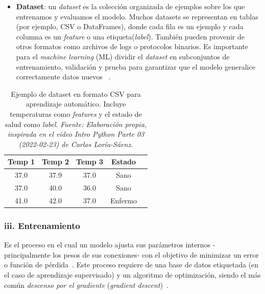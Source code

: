 \documentclass[11pt]{article} %
\begin{document}
\begin{itemize}
    \item \textbf{Dataset}: un \textit{dataset} es la colección organizada de ejemplos sobre los que entrenamos y evaluamos el modelo. Muchos datasets se representan en tablas (por ejemplo, CSV o DataFrames), donde cada fila es un ejemplo y cada columna es un \textit{feature} o una etiqueta(\textit{label}). También pueden provenir de otros formatos como archivos de logs o protocolos binarios. Es importante para el \textit{machine learning} (ML) dividir el \textit{dataset} en subconjuntos de entrenamiento, validación y prueba para garantizar que el modelo generalice correctamente datos nuevos ~\cite{googleML2025}.
\end{itemize}

\begin{table}[h]
\centering
\caption{Ejemplo de dataset en formato CSV para aprendizaje automático. Incluye temperaturas como \textit{features} y el estado de salud como \textit{label}. \textit{Fuente: Elaboración propia, inspirada en el video \textit{Intro Python Parte 03 (2022-02-23)} de Carlos Loría-Sáenz.}}

\label{tab:ml_dataset_example}
\begin{tabular}{|c|c|c|c|c|}
\hline
\textbf{Temp 1} & \textbf{Temp 2} & \textbf{Temp 3} & \textbf{Estado} \\
\hline
37.0 & 37.9 & 37.0 & Sano \\
37.0 & 40.0 & 36.0 & Sano \\
41.0 & 42.0 & 37.0 & Enfermo \\
\hline
\end{tabular}
\end{table}
\vspace{8pt}
\subsubsection{iii. Entrenamiento}
Es el proceso en el cual un modelo ajusta sus parámetros internos -principalmente los pesos de sus conexiones- con el objetivo de minimizar un error o función de pérdida~\cite{nvidia}. Este proceso requiere de una base de datos etiquetada (en el caso de aprendizaje supervisado) y un algoritmo de optimización, siendo el más común \textit{descenso por el gradiente} (\textit{gradient descent})~\cite{sanchez}.
\end{document}
